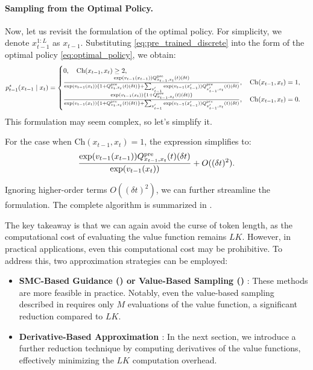 \paragraph{Sampling from the Optimal Policy.} Now, let us revisit the formulation of the optimal policy. For simplicity, we denote  $x^{1:L}_{t-1}$ as $x_{t-1}$. Substituting \eqref{eq:pre_trained_discrete} into the form of the optimal policy \eqref{eq:optimal_policy}, we obtain:
\begin{align*}
    p^{\star}_{t-1}(x_{t-1} \mid x_t)=\begin{cases}
       0, \quad \mathrm{Ch}(x_{t-1}, x_{t}) \geq  2, \\
      \frac{\exp(v_{t-1}(x_{t-1})) Q^{\mathrm{pre}}_{x_{t-1},x_t}(t)  (\delta t)}{\exp(v_{t-1}(x_{t}))\{1 +  Q^{\mathrm{pre}}_{x_{t},x_t}(t)(\delta t)\}  + \sum_{x'_{t-1}} \exp(v_{t-1}(x'_{t-1})) Q^{\mathrm{pre}}_{x'_{t-1},x_t}(t)  (\delta t)   }, 
      \quad  \mathrm{Ch}(x_{t-1}, x_{t}) = 1, \\ 
    \frac{ \exp(v_{t-1}(x_{t}))\{1 +  Q^{\mathrm{pre}}_{x_{t-1},x_t}(t)(\delta t)  \} }{\exp(v_{t-1}(x_{t}))\{1 +  Q^{\mathrm{pre}}_{x_{t},x_t}(t)(\delta t)\}   + \sum_{x'_{t-1}} \exp(v_{t-1}(x'_{t-1})) Q^{\mathrm{pre}}_{x'_{t-1},x_t}(t)  (\delta t)   }, \quad  \mathrm{Ch}(x_{t-1}, x_{t}) = 0.
    \end{cases}
\end{align*}
This formulation may seem complex, so let’s simplify it.

For the case when $\mathrm{Ch}(x_{t-1}, x_{t}) = 1$, the expression simplifies to:
\begin{align*}
       \frac{\exp(v_{t-1}(x_{t-1})) Q^{\mathrm{pre}}_{x_{t-1},x_t}(t)  (\delta t)}{\exp(v_{t-1}(x_{t})) } + O((\delta t)^2). 
\end{align*}

Ignoring higher-order terms $O((\delta t)^2)$, we can further streamline the formulation. The complete algorithm is summarized in   \citep{nisonoff2024unlocking}.  


The key takeaway is that we can again avoid the curse of token length, as the computational cost of evaluating the value function remains $LK$. However, in practical applications, even this computational cost may be prohibitive. To address this, two approximation strategies can be employed:
\begin{itemize}
    \item \textbf{SMC-Based Guidance () or Value-Based Sampling () }: These methods are more feasible in practice. Notably, even the value-based sampling described in  requires only $M$ evaluations of the value function, a significant reduction compared to $LK$.
\item \textbf{Derivative-Based Approximation \citep{nisonoff2024unlocking,vignac2023digress}}: In the next section, we introduce a further reduction technique by computing derivatives of the value functions, effectively minimizing the $LK$ computation overhead.
\end{itemize}


